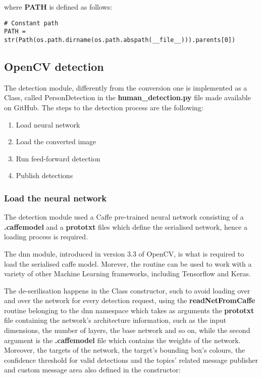 where \textbf{PATH} is defined as follows:

\begin{lstlisting}
# Constant path
PATH = str(Path(os.path.dirname(os.path.abspath(__file__))).parents[0])
\end{lstlisting}

\subsection{OpenCV detection}

The detection module, differently from the conversion one is implemented as a Class, called PersonDetection in the \textbf{human\_detection.py} file made available on GitHub. The steps to the detection process are the following:

\begin{enumerate}
  \item Load neural network
  \item Load the converted image
  \item Run feed-forward detection
  \item Publish detections
\end{enumerate}

\subsubsection{Load the neural network}

The detection module used a Caffe pre-trained neural network consisting of a \textbf{.caffemodel} and a \textbf{prototxt} files which define the serialised network, hence a loading process is required.

The dnn module, introduced in version 3.3 of OpenCV, is what is required to load the serialised caffe model. Morever, the routine can be used to work with a variety of other Machine Learning frameworks, including Tensorflow and Keras.

The de-serilisation happens in the Class constructor, such to avoid loading over and over the network for every detection request, using the \textbf{readNetFromCaffe} routine belonging to the dnn namespace which takes as arguments the \textbf{prototxt} file containing the network's architecture information, such as the input dimensions, the number of layers, the base network and so on, while the second argument is the \textbf{.caffemodel} file which contains the weights of the network. Moreover, the targets of the network, the target's bounding box's colours, the confidence threshold for valid detections and the topics' related message publisher and custom message area also defined in the constructor:

